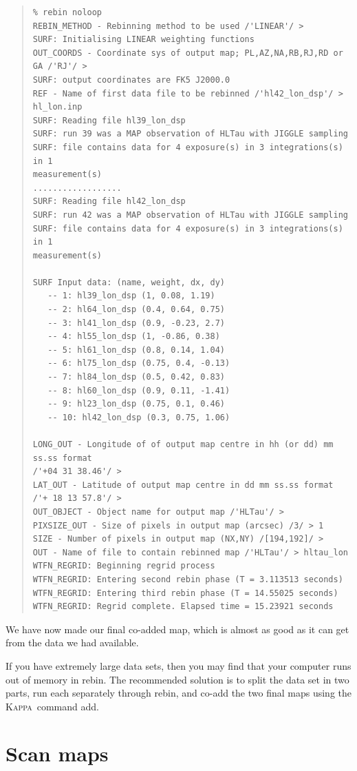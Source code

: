 \documentclass[twoside,11pt]{article}
\newenvironment{myquote}{\begin{quote}\begin{small}}{\end{small}\end{quote}}
\newcommand{\Kappa}{\xref{\textsc{Kappa}}{sun95}{}}
\newcommand{\task}[1]{\textsf{#1}}
\newcommand{\rebin}{\xref{\task{rebin}}{sun216}{REBIN}}
\newcommand{\add}{\xref{\task{add}}{sun95}{ADD}}
\newcommand{\xref}[3]{#1}
\newcommand{\xlabel}[1]{}
\renewcommand{\_}{\texttt{\symbol{95}}}
\begin{document}
\begin{myquote}
\begin{verbatim}
% rebin noloop
REBIN_METHOD - Rebinning method to be used /'LINEAR'/ > 
SURF: Initialising LINEAR weighting functions
OUT_COORDS - Coordinate sys of output map; PL,AZ,NA,RB,RJ,RD or GA /'RJ'/ > 
SURF: output coordinates are FK5 J2000.0
REF - Name of first data file to be rebinned /'hl42_lon_dsp'/ > hl_lon.inp
SURF: Reading file hl39_lon_dsp
SURF: run 39 was a MAP observation of HLTau with JIGGLE sampling
SURF: file contains data for 4 exposure(s) in 3 integrations(s) in 1
measurement(s)
..................
SURF: Reading file hl42_lon_dsp
SURF: run 42 was a MAP observation of HLTau with JIGGLE sampling
SURF: file contains data for 4 exposure(s) in 3 integrations(s) in 1
measurement(s)
 
SURF Input data: (name, weight, dx, dy)
   -- 1: hl39_lon_dsp (1, 0.08, 1.19)
   -- 2: hl64_lon_dsp (0.4, 0.64, 0.75)
   -- 3: hl41_lon_dsp (0.9, -0.23, 2.7)
   -- 4: hl55_lon_dsp (1, -0.86, 0.38)
   -- 5: hl61_lon_dsp (0.8, 0.14, 1.04)
   -- 6: hl75_lon_dsp (0.75, 0.4, -0.13)
   -- 7: hl84_lon_dsp (0.5, 0.42, 0.83)
   -- 8: hl60_lon_dsp (0.9, 0.11, -1.41)
   -- 9: hl23_lon_dsp (0.75, 0.1, 0.46)
   -- 10: hl42_lon_dsp (0.3, 0.75, 1.06)

LONG_OUT - Longitude of of output map centre in hh (or dd) mm ss.ss format
/'+04 31 38.46'/ > 
LAT_OUT - Latitude of output map centre in dd mm ss.ss format 
/'+ 18 13 57.8'/ > 
OUT_OBJECT - Object name for output map /'HLTau'/ > 
PIXSIZE_OUT - Size of pixels in output map (arcsec) /3/ > 1
SIZE - Number of pixels in output map (NX,NY) /[194,192]/ > 
OUT - Name of file to contain rebinned map /'HLTau'/ > hltau_lon
WTFN_REGRID: Beginning regrid process
WTFN_REGRID: Entering second rebin phase (T = 3.113513 seconds)
WTFN_REGRID: Entering third rebin phase (T = 14.55025 seconds)
WTFN_REGRID: Regrid complete. Elapsed time = 15.23921 seconds
\end{verbatim}
\end{myquote}

We have now made our final co-added map, which is almost as good as it
can get from the data we had available.

If you have extremely large data sets, then you may find that your
computer runs out of memory in \rebin. The recommended solution is to
split the data set in two parts, run each separately through \rebin,
and co-add the two final maps using the \Kappa\ command \add.

\section{\xlabel{Scanmaps}Scan maps}
\end{document}
